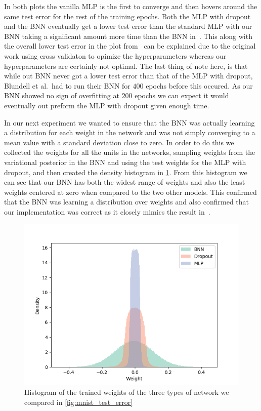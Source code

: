 \documentclass[11pt]{article}
\begin{document}
In both plots the vanilla MLP is the first to converge and then hovers around
the same test error for the rest of the training epochs. Both the MLP with
dropout and the BNN eventually get a lower test error than the standard MLP
with our BNN taking a significant amount more time than the BNN
in~\cite{blundell}. This along with the overall lower test error in the plot
from~\cite{blundell} can be explained due to the original work using cross
validaton to opimize the hyperparameters whereas our hyperparameters are
certainly not optimal. The last thing of note here, is that while out BNN never
got a lower test error than that of the MLP with dropout, Blundell et al.\ had
to run their BNN for $400$ epochs before this occured. As our BNN showed no
sign of overfitting at $200$ epochs we can expect it would eventually out
preform the MLP with dropout given enough time.

In our next experiment we wanted to ensure that the BNN was actually learning 
a distribution for each weight in the network and was not simply converging to
a mean value with a standard deviation close to zero. In order to do this we
collected the weights for all the units in the networks, sampling weights 
from the variational posterior in the BNN and using the test weights for the 
MLP with dropout, and then created the density histogram in
\cref{fig:mnist_weight_density}. From this histogram we can see that our BNN
has both the widest range of weights and also the least weights centered at
zero when compared to the two other models. This confirmed that the BNN was
learning a distribution over weights and also confirmed that our 
implementation was correct as it closely mimics the result in~\cite{blundell}.

\begin{figure}
  \centering
  \includegraphics[width=.6\textwidth]{figures/weight_density_compare.png}
  \caption{Histogram of the trained weights of the three types of network we
  compared in \cref{fig:mnist_test_error}}\label{fig:mnist_weight_density}
\end{figure}
\end{document}
